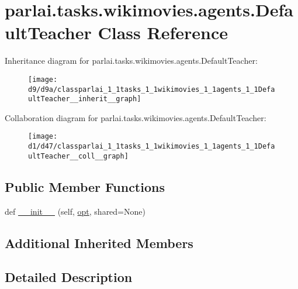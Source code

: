 \hypertarget{classparlai_1_1tasks_1_1wikimovies_1_1agents_1_1DefaultTeacher}{}\section{parlai.\+tasks.\+wikimovies.\+agents.\+Default\+Teacher Class Reference}
\label{classparlai_1_1tasks_1_1wikimovies_1_1agents_1_1DefaultTeacher}


Inheritance diagram for parlai.\+tasks.\+wikimovies.\+agents.\+Default\+Teacher\+:\nopagebreak
\begin{figure}[H]
\begin{center}
\leavevmode
\texttt{[image: d9/d9a/classparlai\_1\_1tasks\_1\_1wikimovies\_1\_1agents\_1\_1DefaultTeacher\_\_inherit\_\_graph]}
\end{center}
\end{figure}


Collaboration diagram for parlai.\+tasks.\+wikimovies.\+agents.\+Default\+Teacher\+:\nopagebreak
\begin{figure}[H]
\begin{center}
\leavevmode
\texttt{[image: d1/d47/classparlai\_1\_1tasks\_1\_1wikimovies\_1\_1agents\_1\_1DefaultTeacher\_\_coll\_\_graph]}
\end{center}
\end{figure}
\subsection*{Public Member Functions}
\begin{DoxyCompactItemize}
\item 
def \hyperlink{classparlai_1_1tasks_1_1wikimovies_1_1agents_1_1DefaultTeacher_a4bef6f1b4e0fff6a37c8ec1441cd9e6c}{\+\_\+\+\_\+init\+\_\+\+\_\+} (self, \hyperlink{classparlai_1_1core_1_1teachers_1_1FbDialogTeacher_af7a9ec497b9cd0292d7b8fa220da7c28}{opt}, shared=None)
\end{DoxyCompactItemize}
\subsection*{Additional Inherited Members}


\subsection{Detailed Description}


